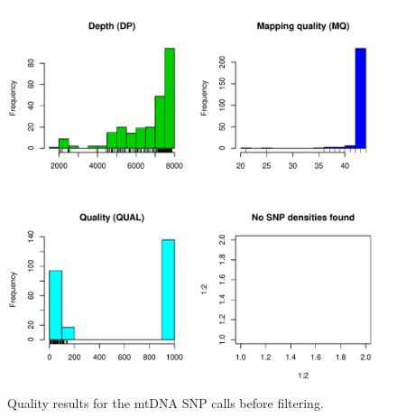 \documentclass{article}\usepackage[]{graphicx}\usepackage[]{color}
\makeatletter
\def\maxwidth{ %
  \ifdim\Gin@nat@width>\linewidth
    \linewidth
  \else
    \Gin@nat@width
  \fi
}
\newenvironment{knitrout}{}{} %
\makeatother
\begin{document}
\begin{knitrout}
\color{fgcolor}\begin{figure}[h!]

\includegraphics[width=\maxwidth]{figure/plot_unfilter} \caption[Quality results for the mtDNA SNP calls before filtering]{Quality results for the mtDNA SNP calls before filtering.\label{fig:plot_unfilter}}
\end{figure}


\end{knitrout}
\end{document}

